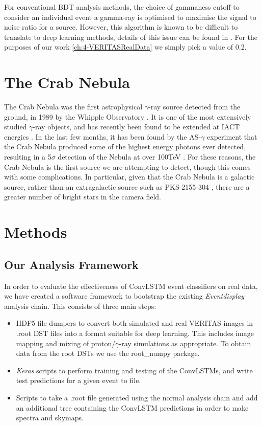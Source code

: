 For conventional BDT analysis methods, the choice of gammaness cutoff to consider an individual event a gamma-ray is optimised to maximise the signal to noise ratio for a source. However, this algorithm is known to be difficult to translate to deep learning methods, details of this issue can be found in \cite{Shilon}. For the purposes of our work \ref{ch:4-VERITASRealData} we simply pick a value of 0.2.

\section{The Crab Nebula}
The Crab Nebula was the first astrophysical $\gamma$-ray source detected from the ground, in 1989 by the Whipple Observatory \cite{weekestev}. It is one of the most extensively studied $\gamma$-ray objects, and has recently been found to be extended at IACT energies \cite{holler}. In the last few months, it has been found by the AS-$\gamma$ experiment that the Crab Nebula produced some of the highest energy photons ever detected, resulting in a 5$\sigma$ detection of the Nebula at over 100TeV \cite{asgamma}. For these reasons, the Crab Nebula is the first source we are attempting to detect, though this comes with some complications. In particular, given that the Crab Nebula is a galactic source, rather than an extragalactic source such as PKS-2155-304 \cite{Shilon}, there are a greater number of bright stars in the camera field.

\section{Methods}
\subsection{Our Analysis Framework}
In order to evaluate the effectiveness of ConvLSTM event classifiers on real data, we have created a software framework to bootstrap the existing \textit{Eventdisplay} analysis chain. This consists of three main steps:

\begin{itemize}
    \item HDF5 file dumpers to convert both simulated and real VERITAS images in .root DST files into a format suitable for deep learning. This includes image mapping and mixing of proton/$\gamma$-ray simulations as appropriate. To obtain data from the root DSTs we use the root\_numpy \cite{rootnumpy} package.
    \item \textit{Keras} scripts to perform training and testing of the ConvLSTMs, and write test predictions for a given event to file.
    \item Scripts to take a .root file generated using the normal analysis chain and add an additional tree containing the ConvLSTM predictions in order to make spectra and skymaps.
\end{itemize}


